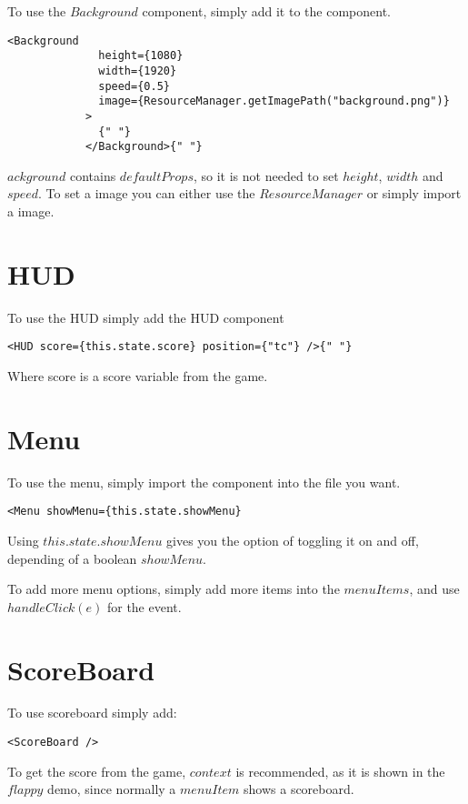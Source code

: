 To use the $Background$ component, simply add it to the component.

\begin{lstlisting}
<Background
              height={1080}
              width={1920}
              speed={0.5}
              image={ResourceManager.getImagePath("background.png")}
            >
              {" "}
            </Background>{" "}
\end{lstlisting}

$ackground$ contains $defaultProps$, so it is not needed to set $height$, $width$ and $speed$. To set a image you can either use the $ResourceManager$ or simply import a image.

\section{HUD}
To use the HUD simply add the HUD component
\begin{lstlisting}
<HUD score={this.state.score} position={"tc"} />{" "}
\end{lstlisting}

Where score is a score variable from the game.

\section{Menu}
To use the menu, simply import the component into the file you want.

\begin{lstlisting}
<Menu showMenu={this.state.showMenu}
\end{lstlisting}

Using ${this.state.showMenu}$ gives you the option of toggling it on and off, depending of a boolean $showMenu$.

To add more menu options, simply add more items into the $menuItems$, and use $handleClick(e)$ for the event.

\section{ScoreBoard}
To use scoreboard simply add:

\begin{lstlisting}
<ScoreBoard />
\end{lstlisting}

To get the score from the game, $context$ is recommended, as it is shown in the $flappy$ demo, since normally a $menuItem$ shows a scoreboard.

